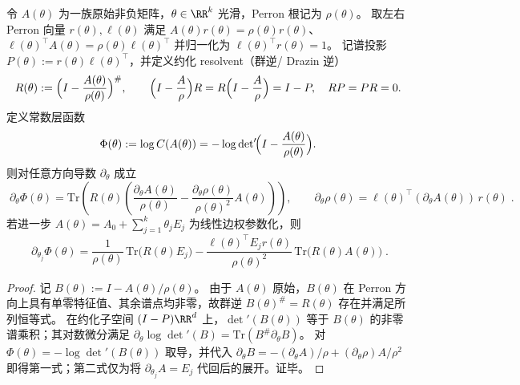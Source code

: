 \begin{theorem}\label{thm:finite-part-reduced-determinant-group-inverse-gradient}
令 \(A(\theta)\) 为一族原始非负矩阵，\(\theta\in\RR^k\) 光滑，Perron 根记为 \(\rho(\theta)\)。
取左右 Perron 向量 \(r(\theta),\ell(\theta)\) 满足
\(
A(\theta)r(\theta)=\rho(\theta)r(\theta)
\)、
\(
\ell(\theta)^\top A(\theta)=\rho(\theta)\ell(\theta)^\top
\)
并归一化为 \(\ell(\theta)^\top r(\theta)=1\)。
记谱投影 \(P(\theta):=r(\theta)\ell(\theta)^\top\)，并定义约化 resolvent（群逆/ Drazin 逆）
\[
R(\theta):=\Bigl(I-\frac{A(\theta)}{\rho(\theta)}\Bigr)^{\#},
\qquad
\Bigl(I-\frac{A}{\rho}\Bigr)R=R\Bigl(I-\frac{A}{\rho}\Bigr)=I-P,\quad RP=PR=0.
\]
定义常数层函数
\[
\Phi(\theta):=\log C(A(\theta))
=
-\log\det\nolimits'\!\Bigl(I-\frac{A(\theta)}{\rho(\theta)}\Bigr).
\]
则对任意方向导数 \(\partial_\theta\) 成立
\[
\boxed{\;
\partial_\theta \Phi(\theta)
=
\mathrm{Tr}\!\left(
R(\theta)\left(
\frac{\partial_\theta A(\theta)}{\rho(\theta)}
-\frac{\partial_\theta\rho(\theta)}{\rho(\theta)^2}A(\theta)
\right)\right),\qquad
\partial_\theta\rho(\theta)=\ell(\theta)^\top(\partial_\theta A(\theta))\,r(\theta)\; }.
\]
若进一步 \(A(\theta)=A_0+\sum_{j=1}^{k}\theta_jE_j\) 为线性边权参数化，则
\[
\boxed{\;
\partial_{\theta_j}\Phi(\theta)
=
\frac{1}{\rho(\theta)}\,\mathrm{Tr}\!\bigl(R(\theta)E_j\bigr)
-\frac{\ell(\theta)^\top E_j r(\theta)}{\rho(\theta)^2}\,
\mathrm{Tr}\!\bigl(R(\theta)A(\theta)\bigr)\; }.
\]
\end{theorem}
\begin{proof}
记 \(B(\theta):=I-A(\theta)/\rho(\theta)\)。
由于 \(A(\theta)\) 原始，\(B(\theta)\) 在 Perron 方向上具有单零特征值、其余谱点均非零，故群逆 \(B(\theta)^{\#}=R(\theta)\) 存在并满足所列恒等式。
在约化子空间 \((I-P)\RR^d\) 上，\(\det\nolimits'(B(\theta))\) 等于 \(B(\theta)\) 的非零谱乘积；其对数微分满足
\(
\partial_\theta\log\det\nolimits'(B)=\mathrm{Tr}(B^{\#}\partial_\theta B)
\)。
对 \(\Phi(\theta)=-\log\det\nolimits'(B(\theta))\) 取导，并代入
\(
\partial_\theta B=-(\partial_\theta A)/\rho+(\partial_\theta\rho)A/\rho^2
\)
即得第一式；第二式仅为将 \(\partial_{\theta_j}A=E_j\) 代回后的展开。证毕。
\end{proof}

